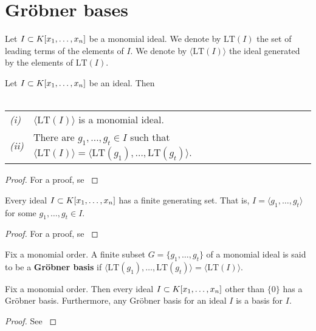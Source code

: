 \documentclass[english,bachelor]{liumaiex}
\begin{document}
\chapter{Gröbner bases}
\label{ch:grobner}

\begin{define}
Let $I\subset K[x_1,\dots, x_n]$ be a monomial ideal. We denote by $\textrm{LT}(I)$ the set of leading terms of the elements of $I$. We denote by $\langle \mathrm{LT}(I)\rangle$ the ideal generated by the elements of $\textrm{LT}(I)$.
\end{define}

\begin{prop}
Let $I\subset K[x_1,\dots, x_n]$ be an ideal. Then\\ \\
\begin{tabular}{l p{10cm}}
\emph{(i)} & $\langle\textrm{LT}(I)\rangle$ is a monomial ideal.\\
\emph{(ii)} & There are $g_1,\dots,g_t\in I$ such that $\langle\textrm{LT}(I)\rangle=\langle\textrm{LT}(g_1),\dots,\textrm{LT}(g_t)\rangle$.
\end{tabular}
\end{prop}

\begin{proof}
For a proof, se \cite[p. 76]{cox}
\end{proof}

\begin{thm}
Every ideal $I\subset K[x_1,\dots, x_n]$ has a finite generating set. That is, $I=\langle g_1,\dots,g_t\rangle$ for some $g_1,\dots,g_t\in I$.
\end{thm}
\begin{proof}
For a proof, se \cite[pp. 76-77]{cox}
\end{proof}

\begin{define}
Fix a monomial order. A finite subset $G=\{g_1,\dots,g_t\}$ of a monomial ideal is said to be a \textbf{Gröbner basis} if $\langle \textrm{LT}(g_1),\dots,\textrm{LT}(g_t)\rangle=\langle \textrm{LT}(I)\rangle$.
\end{define}

\begin{cor}
Fix a monomial order. Then every ideal $I\subset K[x_1,\dots, x_n]$ other than $\{0\}$ has a Gröbner basis. Furthermore, any Gröbner basis for an ideal $I$ is a basis for $I$.
\end{cor}
\begin{proof}
See \cite[p. 77]{cox}
\end{proof}
\end{document}

